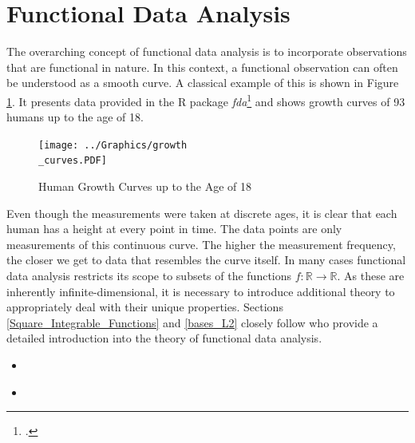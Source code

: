 \documentclass[12pt, a4paper]{article}
\theoremstyle{MAstyle} \newtheorem{assumption}{Assumption}[section]
\theoremstyle{MAstyle} \newtheorem{definition}{Definition}[section]
\theoremstyle{MAstyle} \newtheorem{theorem}{Theorem}[section]
\begin{document}
	\section{Functional Data Analysis}\label{FDA}
		The overarching concept of functional data analysis is to incorporate observations that are functional in nature. In this context, a functional observation can often be understood as a smooth curve. A classical example of this is shown in Figure \ref{growth_curves}. It presents data provided in the R package \textit{fda}\footcite{fda} and shows growth curves of 93 humans up to the age of 18.
		\begin{figure}[H]
			\texttt{[image: ../Graphics/growth\\\_curves.PDF]}
			\caption{Human Growth Curves up to the Age of 18}
			\label{growth_curves}
		\end{figure}
		Even though the measurements were taken at discrete ages, it is clear that each human has a height at every point in time. The data points are only measurements of this continuous curve. The higher the measurement frequency, the closer we get to data that resembles the curve itself.
		In many cases functional data analysis restricts its scope to subsets of the functions $f:\mathbb{R} \rightarrow \mathbb{R}$.
		As these are inherently infinite-dimensional, it is necessary to introduce additional theory to appropriately deal with their unique properties. Sections \ref{Square_Integrable_Functions} and \ref{bases_L2} closely follow \cite{hsing_theoretical_2015} who provide a detailed introduction into the theory of functional data analysis.
		
		\begin{itemize}
			\item \cite{ramsay_functional_2005}
			\item \cite{kokoszka_introduction_2021}
		\end{itemize}
	
\end{document}
